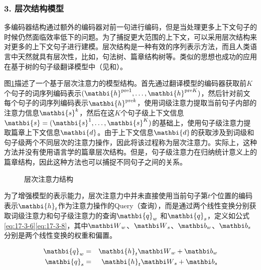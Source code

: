 
\subsubsection{3. 层次结构模型}


\parinterval 多编码器结构通过额外的编码器对前一句进行编码，但是当处理更多上下文句子的时候仍然面临效率低下的问题。为了捕捉更大范围的上下文，可以采用层次结构来对更多的上下文句子进行建模。层次结构是一种有效的序列表示方法，而且人类语言中天然就具有层次性，比如，句法树、篇章结构树等。类似的思想也成功的应用在基于树的句子级翻译模型中（见{\chaptereight}和{\chapterfifteen}）。

\parinterval 图\ref{fig:17-19}描述了一个基于层次注意力的模型结构。首先通过翻译模型的编码器获取前$K$个句子的词序列编码表示$(\mathbi{h}^{\textrm{pre}1},\dots,\mathbi{h}^{\textrm{pre}K})$，然后针对前文每个句子的词序列编码表示$\mathbi{h}^{\textrm{pre}k}$，使用词级注意力提取当前句子内部的注意力信息$\mathbi{s}^{k}$，然后在这$K$个句子级上下文信息$\mathbi{s}=(\mathbi{s}^1,\dots,\mathbi{s}^K)$的基础上，使用句子级注意力提取篇章上下文信息$\mathbi{d}$。由于上下文信息$\mathbi{d}$的获取涉及到词级和句子级两个不同层次的注意力操作，因此将该过程称为层次注意力。实际上，这种方法并没有使用语言学的篇章层次结构。但是，句子级注意力在归纳统计意义上的篇章结构，因此这种方法也可以捕捉不同句子之间的关系。

\begin{figure}[htp]
    \centering
	
    \caption{层次注意力结构}
    \label{fig:17-19}
\end{figure}

\parinterval 为了增强模型的表示能力，层次注意力中并未直接使用当前句子第$t$个位置的编码表示$\mathbi{h}_{t}$作为注意力操作的Query（查询），而是通过两个线性变换分别获取词级注意力和句子级注意力的查询$\mathbi{q}_{w}$ 和$\mathbi{q}_{s}$，定义如公式\eqref{eq:17-3-6}\eqref{eq:17-3-8}，其中${\mathbi W}_w$、${\mathbi W}_s$、${\mathbi b}_w$、${\mathbi b}_s$分别是两个线性变换的权重和偏置。

\begin{eqnarray}
\mathbi{q}_{w}&=&\mathbi{h}_t{\mathbi W}_w +{\mathbi b}_w
\label{eq:17-3-6}\\
\mathbi{q}_{s}&=&\mathbi{h}_t{\mathbi W}_s +{\mathbi b}_s
\label{eq:17-3-8}
\end{eqnarray}



